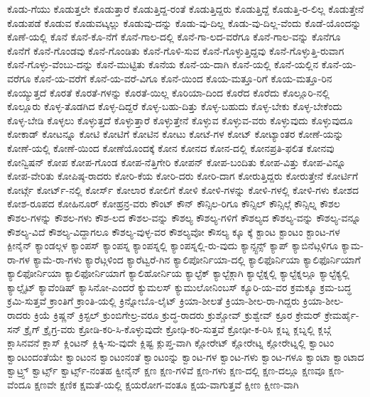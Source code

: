{ಕೊಡು-ಗೆಯು
ಕೊಡುತ್ತಲೇ
ಕೊಡುತ್ತಾರೆ
ಕೊಡುತ್ತಿದ್ದ-ರಂತೆ
ಕೊಡುತ್ತಿದ್ದರು
ಕೊಡುತ್ತಿದ್ದೆ
ಕೊಡುತ್ತಿ-ರ-ಲಿಲ್ಲ
ಕೊಡುತ್ತೇನೆ
ಕೊಡುಪಡೆ
ಕೊಡುವ
ಕೊಡುವಟ್ಕಲ್ಲು
ಕೊಡುವು-ದನ್ನು
ಕೊಡು-ವು-ದಿಲ್ಲ
ಕೊಡು-ವು-ದಿಲ್ಲ-ವೆಂದು
ಕೊಡೆ-ಯೊಂದನ್ನು
ಕೊಣೆ-ಯಲ್ಲಿ
ಕೊನೆ
ಕೊನೆ-ಕೊ-ನೆಗೆ
ಕೊನೆ-ಗಾಲ-ದಲ್ಲಿ
ಕೊನೆ-ಗಾ-ಲದ-ವರೆಗೂ
ಕೊನೆ-ಗಾಲ-ವನ್ನು
ಕೊನೆಗೂ
ಕೊನೆಗೆ
ಕೊನೆ-ಗೊಂಡವು
ಕೊನೆ-ಗೊಂಡಿತು
ಕೊನೆ-ಗೊಳಿ-ಸುವ
ಕೊನೆ-ಗೊಳ್ಳುತ್ತಿದ್ದವು
ಕೊನೆ-ಗೊಳ್ಳುತ್ತಿ-ರುವಾಗ
ಕೊನೆ-ಗೊಳ್ಳು-ವೆಂಬು-ದನ್ನು
ಕೊನೆ-ಮುಟ್ಟಿತು
ಕೊನೆಯ
ಕೊನೆ-ಯ-ದಾಗಿ
ಕೊನೆ-ಯಲ್ಲಿ
ಕೊನೆ-ಯಲ್ಲಿನ
ಕೊನೆ-ಯ-ವರೆಗೂ
ಕೊನೆ-ಯ-ವರೆಗೆ
ಕೊನೆ-ಯ-ವರೆ-ವಿಗೂ
ಕೊನೆ-ಯಿಂದ
ಕೊಯ-ಮತ್ತೂ-ರಿಗೆ
ಕೊಯ-ಮತ್ತೂ-ರಿನ
ಕೊಯ್ಯುತ್ತದೆ
ಕೊರತೆ
ಕೊರತೆ-ಗಳನ್ನು
ಕೊರತೆ-ಯಿಲ್ಲ
ಕೊರಿಯಾ-ದಿಂದ
ಕೊರೆದ
ಕೊರೆದು
ಕೊಲ್ಲೂರಿ-ನಲ್ಲಿ
ಕೊಲ್ಲೂರು
ಕೊಳ್ಳ-ತೊಡಗಿದ
ಕೊಳ್ಳ-ದಿದ್ದರೆ
ಕೊಳ್ಳ-ಬಹು-ದಿತ್ತು
ಕೊಳ್ಳ-ಬಹುದು
ಕೊಳ್ಳ-ಬೇಕು
ಕೊಳ್ಳ-ಬೇಕೆಂದು
ಕೊಳ್ಳ-ಬೇಡಿ
ಕೊಳ್ಳಲು
ಕೊಳ್ಳುತ್ತದೆ
ಕೊಳ್ಳುತ್ತಾರೆ
ಕೊಳ್ಳುತ್ತೇನೆ
ಕೊಳ್ಳುವ
ಕೊಳ್ಳುವ-ವರು
ಕೊಳ್ಳುವುದು
ಕೊಳ್ಳುವುದೂ
ಕೋಕಾಡ್
ಕೋಟನ್ನೂ
ಕೋಟಿ
ಕೋಟಿಗೆ
ಕೋಟಿನ
ಕೋಟು
ಕೋಟೆ-ಗಳ
ಕೋಟ್
ಕೋಟ್ಯಾಂತರ
ಕೋಣೆ-ಯನ್ನು
ಕೋಣೆ-ಯಲ್ಲಿ
ಕೋಣೆ-ಯಿಂದ
ಕೋಣೆಯೊಂದಕ್ಕೆ
ಕೋನ
ಕೋನದ
ಕೋನ-ದಲ್ಲಿ
ಕೋನಪ್ರತಿ-ಫಲಿತ
ಕೋನವು
ಕೋನ್ವಿಷನ್
ಕೋಪ
ಕೋಪ-ಗೊಂಡ
ಕೋಪ-ನೆತ್ತಿಗೇರಿ
ಕೋಪನ್
ಕೋಪ-ಬಂದಿತು
ಕೋಪ-ವಿತ್ತು
ಕೋಪ-ವಿನ್ನೂ
ಕೋಪ-ವೇರಿತು
ಕೋಪಿಷ್ಠ-ರಾದರು
ಕೋರಿ-ಕೆಯ
ಕೋರಿ-ದರು
ಕೋರಿ-ದಾಗ
ಕೋರುತ್ತಿದ್ದರು
ಕೋರುತ್ತೇನೆ
ಕೋರ್ಟಿಗೆ
ಕೋರ್ಟ್ಗೆ
ಕೋರ್ಟ್-ನಲ್ಲಿ
ಕೋರ್ಸ್
ಕೋಲಾರ
ಕೋಲಿಗೆ
ಕೋಳಿ
ಕೋಳಿ-ಗಳನ್ನು
ಕೋಳಿ-ಗಳಲ್ಲಿ
ಕೋಳಿ-ಗಳು
ಕೋಶದ
ಕೋಶ-ರೂಪದ
ಕೋಹಿನೂರ್
ಕೋಹ್ರನ್ರ-ವರು
ಕೌಂಟ್
ಕೌನ್
ಕೌನ್ಸಿಲ-ರಿಗೂ
ಕೌನ್ಸಿಲ್
ಕೌನ್ಸಿಲ್ಗೆ
ಕೌನ್ಸಿಲ್ನ
ಕೌಶಲ
ಕೌಶಲ-ಗಳನ್ನು
ಕೌಶಲ-ಗಳು
ಕೌಶ-ಲದ
ಕೌಶಲ-ವನ್ನು
ಕೌಶಲ್ಯ
ಕೌಶಲ್ಯ-ಗಳಿಗೆ
ಕೌಶಲ್ಯದ
ಕೌಶಲ್ಯ-ವನ್ನು
ಕೌಶಲ್ಯ-ವನ್ನೂ
ಕೌಶಲ್ಯ-ವಿದೆ
ಕೌಶಲ್ಯ-ವಿದ್ದಾಗಲೂ
ಕೌಶಲ್ಯ-ವುಳ್ಳ-ವರ
ಕೌಶಲ್ಯವೋ
ಕೌಸಲ್ಯ
ಕ್ಕೂ
ಕ್ಕೆ
ಕ್ಟಾಂಟ
ಕ್ಟಾಂಟಂ
ಕ್ಟಾಂಟ-ಗಳ
ಕ್ಪೀನೈನ್
ಕ್ಯಾಂಡಲ್ಗಳ
ಕ್ಯಾಂಪಸ್
ಕ್ಯಾಂಪಸ್ನ
ಕ್ಯಾಂಪಸ್ನಲ್ಲಿ
ಕ್ಯಾಂಪಸ್ನಲ್ಲಿ-ರು-ವುದು
ಕ್ಯಾನ್ಸ್ಟನ್ಸ್
ಕ್ಯಾಪ್
ಕ್ಯಾಬಿನೆಟ್ಗಳಿಗೂ
ಕ್ಯಾಮ-ರಾ-ಗಳ
ಕ್ಯಾಮೆ-ರಾ-ಗಳು
ಕ್ಯಾರೆಟ್ಗಳಿಂದ
ಕ್ಯಾರೆಟ್ವರೆ-ಗಿನ
ಕ್ಯಾಲಿಪೋರ್ನಿಯಾ-ದಲ್ಲಿ
ಕ್ಯಾಲಿಫೊರ್ನಿಯಾ
ಕ್ಯಾಲಿಫೊರ್ನಿಯಾಗೆ
ಕ್ಯಾಲಿಫೋರ್ನಿಯಾ
ಕ್ಯಾಲಿಫೋರ್ನಿಯಾಗೆ
ಕ್ಯಾಲಿಹೋರ್ನಿಯ
ಕ್ಯಾಲ್ಟೆಕ್
ಕ್ಯಾಲ್ಟೆಕ್ಗಾಗಿ
ಕ್ಯಾಲ್ಟೆಕ್ನಲ್ಲಿ
ಕ್ಯಾಲ್ಟೆಕ್ನಲ್ಲೂ
ಕ್ಯಾಲ್ಟೆಕ್ಯಲ್ಲಿ
ಕ್ಯಾಲ್ಸೈಟ್
ಕ್ಯಾವೆಂಡಿಷ್
ಕ್ಯಾಸಿನೋ-ಎಂದರೆ
ಕ್ಯುಮಲಸ್
ಕ್ಯುಮುಲೋನಿಂಬಸ್
ಕ್ಯೂರಿ-ಯ-ವರ
ಕ್ರಮಕ್ಕೂ
ಕ್ರಮ-ಬದ್ಧ
ಕ್ರಮಿ-ಸುತ್ತವೆ
ಕ್ರಾಂತಿಗೆ
ಕ್ರಾಂತಿ-ಯಲ್ಲಿ
ಕ್ರಿನ್ನೋಬೊ-ಲೈಟ್
ಕ್ರಿಯಾ-ಶೀಲತೆ
ಕ್ರಿಯಾ-ಶೀಲ-ರಾ-ಗಿದ್ದರು
ಕ್ರಿಯಾ-ಶೀಲ-ರಾದರು
ಕ್ರಿಯೆ
ಕ್ರಿಷ್ಣನ್
ಕ್ರಿಸ್ಟಲ್
ಕ್ರುಂಬಿಗೇಲ್ರ-ವರೂ
ಕ್ರುದ್ಧ-ರಾದರು
ಕ್ರುಶ್ಚೋವ್
ಕ್ರುಶ್ವೇವ್
ಕ್ರೂರ
ಕ್ರೇಮರ್
ಕ್ರೇಮರ್ಹೈ-ಸನ್
ಕ್ರೈಗ್
ಕ್ರೈಗ್ರ-ವರು
ಕ್ರೋಡಿ-ಕರಿ-ಸಿ-ಕೊಳ್ಳುವುದೇ
ಕ್ರೋಢಿ-ಕರಿ-ಸುತ್ತವೆ
ಕ್ರೋಢೀ-ಕ-ರಿಸಿ
ಕ್ಲಬ್ನ
ಕ್ಲಬ್ನಲ್ಲಿ
ಕ್ಲಬ್ಗೆ
ಕ್ಲಾಸಿನವನೆ
ಕ್ಲಾಸ್
ಕ್ಲಿಂಟನ್
ಕ್ಲಿಕ್ಕಿ-ಸು-ವುದೇ
ಕ್ಲಿಷ್ಟ
ಕ್ಲುಪ್ತ-ವಾಗಿ
ಕ್ಲೋರೇಟ್
ಕ್ಲೋರೇಟ್ನ
ಕ್ಲೋರೇಟ್ನಲ್ಲಿ
ಕ್ವಾಂಟಂ
ಕ್ವಾಂಟಂದಂತೆಯೇ
ಕ್ವಾಂಟಂನ
ಕ್ವಾಂಟಂನಂತೆ
ಕ್ವಾಂಟಂನ್ನು
ಕ್ವಾಂಟ-ಗಳ
ಕ್ವಾಂಟ-ಗಳು
ಕ್ವಾಂಟ-ಗಳೂ
ಕ್ವಾಂಟಾ
ಕ್ವಾಂಟಾದ
ಕ್ವಾಟ್ರ್ಸ್
ಕ್ವಾರ್ಟ್ಸ್
ಕ್ವಾರ್ಟ್ಸ್-ನಂತಹ
ಕ್ವೀನೈನ್
ಕ್ಷಣ
ಕ್ಷಣ-ಗಳಿವೆ
ಕ್ಷಣ-ಗಳು
ಕ್ಷಣ-ದಲ್ಲಿ
ಕ್ಷಣ-ದಲ್ಲೂ
ಕ್ಷಣವೂ
ಕ್ಷಣ-ವೆಂದೂ
ಕ್ಷಣವೇ
ಕ್ಷಣಿಕ
ಕ್ಷಮತೆ-ಯಲ್ಲಿ
ಕ್ಷಯರೋಗ-ವಂತೂ
ಕ್ಷಯ-ವಾಗುತ್ತವೆ
ಕ್ಷೀಣ
ಕ್ಷೀಣ-ವಾಗಿ
}
